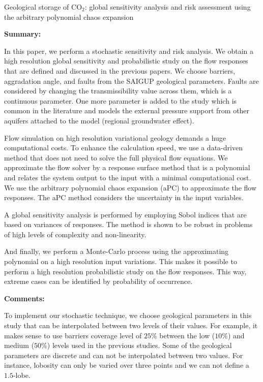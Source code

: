 %
%
{Geological storage of $\mbox{CO}_2$: global sensitivity analysis and risk
assessment using the arbitrary polynomial chaos expansion}
{\textbf{Summary:}

In this paper, we perform a stochastic sensitivity and risk analysis. We obtain
a high resolution global sensitivity and probabilistic study on the flow
responses that are defined and discussed in the previous papers. We choose
barriers, aggradation angle, and
faults from the SAIGUP geological parameters. Faults are considered by changing
the transmissibility value across them, which
is a continuous parameter. One more parameter is added to the study which is
common in the literature and models the external pressure support from other
aquifers attached to the model (regional groundwater effect).

Flow simulation on high resolution variational geology demands a huge
computational costs. To enhance the calculation speed, we use a data-driven
method that does not need to solve the full physical flow equations. We
approximate the flow solver by a response surface method that is a polynomial
and relates the system output to the input with a minimal computational cost.
We use the arbitrary polynomial chaos expansion (aPC) to approximate the
flow responses. The aPC method considers the uncertainty in the input variables.

A global sensitivity analysis is performed by employing Sobol indices that are
based on variances of responses. The method is shown to be robust in problems
of high levels of complexity and non-linearity.  

And finally, we perform a Monte-Carlo process using the approximating polynomial
on a high resolution input variations. This makes it possible to perform a high
resolution probabilistic study on the flow responses. This way, extreme cases
can be identified by probability of occurrence.

\vspace{0.5cm}
\noindent\textbf{Comments:}

To implement our stochastic technique, we choose geological parameters
in this study that can be interpolated between two levels of their values. For
example, it makes sense to use barriers coverage level of $25\%$ between the low
($10\%$) and medium ($50\%$) levels used in the previous studies. Some of the
geological parameters are discrete and can not be interpolated between two
values. For instance, lobosity can only be varied over three points and we can
not define a $1.5$-lobe. 

}
